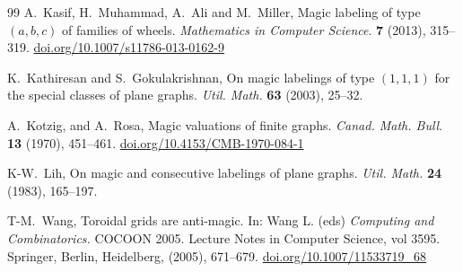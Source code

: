 \documentclass[12pt]{amsart}
\theoremstyle{definition}
\theoremstyle{plain}
\begin{document}
\begin{thebibliography}{99}
A.~Kasif, H.~Muhammad, A.~Ali and M.~Miller, Magic labeling of type $(a, b, c)$ of families of wheels.
\textit{Mathematics in Computer Science}. \textbf{7} (2013), 315--319. \url{doi.org/10.1007/s11786-013-0162-9}

K.~Kathiresan and S.~Gokulakrishnan, On magic labelings of type $(1, 1, 1)$ for the special classes of plane graphs.
\textit{Util. Math.} \textbf{63} (2003), 25--32.

A.~Kotzig, and A.~Rosa, Magic valuations of finite graphs. \textit{Canad. Math. Bull}. \textbf{13} (1970), 451--461. \url{doi.org/10.4153/CMB-1970-084-1}

K-W.~Lih, On magic and consecutive labelings of plane graphs. \textit{Util. Math.} \textbf{24} (1983), 165--197.

T-M.~Wang, Toroidal grids are anti-magic. In: Wang L. (eds) \textit{Computing and Combinatorics.} COCOON 2005. Lecture Notes in Computer Science, vol 3595. Springer, Berlin, Heidelberg, (2005), 671--679. \url{doi.org/10.1007/11533719_68}


\end{thebibliography}
\end{document}
